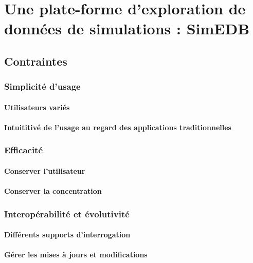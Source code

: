 \clearpage
\section{Une plate-forme d'exploration de données de simulations : SimEDB}\label{sec:SimEDB}
	\subsection{Contraintes}
		\subsubsection{Simplicité d'usage}
			\paragraph*{Utilisateurs variés}
			\paragraph*{Intuititivé de l'usage au regard des applications traditionnelles}
		\subsubsection{Efficacité}
			\paragraph*{Conserver l'utilisateur}
			\paragraph*{Conserver la concentration}
		\subsubsection{Interopérabilité et évolutivité}
			\paragraph*{Différents supports d'interrogation}
			\paragraph*{Gérer les mises à jours et modifications}
